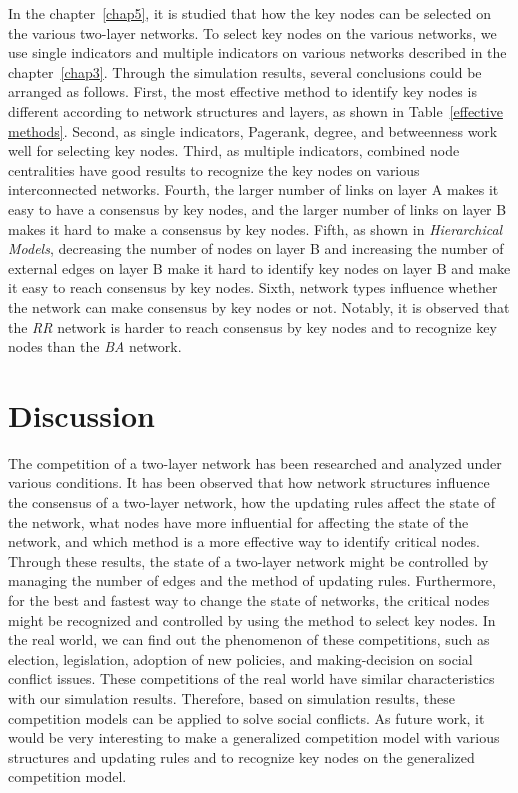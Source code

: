In the chapter~\ref{chap5}, it is studied that how the key nodes can be selected on the various two-layer networks. To select key nodes on the various networks, we use single indicators and multiple indicators on various networks described in the chapter~\ref{chap3}. Through the simulation results, several conclusions could be arranged as follows. First, the most effective method to identify key nodes is different according to network structures and layers, as shown in Table~\ref{effective methods}. Second, as single indicators, Pagerank, degree, and betweenness work well for selecting key nodes. Third, as multiple indicators, combined node centralities have good results to recognize the key nodes on various interconnected networks. Fourth, the larger number of links on layer A makes it easy to have a consensus by key nodes, and the larger number of links on layer B makes it hard to make a consensus by key nodes. Fifth, as shown in \textit{Hierarchical Models}, decreasing the number of nodes on layer B and increasing the number of external edges on layer B make it hard to identify key nodes on layer B and make it easy to reach consensus by key nodes. Sixth, network types influence whether the network can make consensus by key nodes or not. Notably, it is observed that the \textit{RR} network is harder to reach consensus by key nodes and to recognize key nodes than the \textit{BA} network. \\
  
\section{Discussion} 
The competition of a two-layer network has been researched and analyzed under various conditions. It has been observed that how network structures influence the consensus of a two-layer network, how the updating rules affect the state of the network, what nodes have more influential for affecting the state of the network, and which method is a more effective way to identify critical nodes. Through these results, the state of a two-layer network might be controlled by managing the number of edges and the method of updating rules. Furthermore, for the best and fastest way to change the state of networks, the critical nodes might be recognized and controlled by using the method to select key nodes.
In the real world, we can find out the phenomenon of these competitions, such as election, legislation, adoption of new policies, and making-decision on social conflict issues. These competitions of the real world have similar characteristics with our simulation results. Therefore, based on simulation results, these competition models can be applied to solve social conflicts. As future work, it would be very interesting to make a generalized competition model with various structures and updating rules and to recognize key nodes on the generalized competition model.\\   

